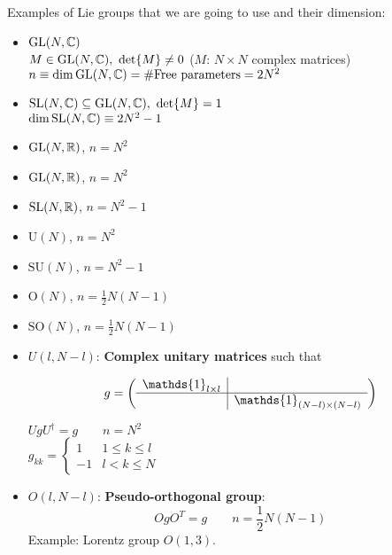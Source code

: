 \documentclass[../../main/main.tex]{subfiles}
\begin{document}
\begin{example}
	Examples of Lie groups that we are going to use and their dimension:
	\begin{itemize}
		\item $\mathrm{GL}(N,\mathbb{C})$\\
			$M \in \mathrm{GL}(N,\mathbb{C}), \ \det{M} \ne 0$ ($M$: $N \times N$ complex matrices)\\
			$n \equiv \dim{\mathrm{GL}(N,\mathbb{C})} = \# \text{Free parameters} = 2 N^2$

		\item $\mathrm{SL}(N,\mathbb{C}) \subseteq \mathrm{GL}(N,\mathbb{C}), \ \det{M} = 1$\\
			$\dim{\mathrm{SL}(N,\mathbb{C})} \equiv 2 N^2 - 1$

		\item $\mathrm{GL}(N,\mathbb{R})$, $n=N^2$

		\item $\mathrm{GL}(N,\mathbb{R})$, $n=N^2$

		\item $\mathrm{SL}(N,\mathbb{R})$, $n=N^2 - 1$

		\item $\mathrm{U}(N)$, $n=N^2$

		\item $\mathrm{SU}(N)$, $n=N^2 - 1$

		\item $\mathrm{O}(N)$, $n=\frac{1}{2} N(N-1)$

		\item $\mathrm{SO}(N)$, $n=\frac{1}{2} N(N-1)$

		\item $U(l,N-l)$: \textbf{Complex unitary matrices} such that

			\begin{minipage}[t]{0.45\textwidth}
				\strut\vspace*{-1.5\baselineskip}\newline
				\[
				g =
				\left(
				\begin{array}{c|c}
				\mathds{1}_{l \times l}
				&	\\
				\hline
				&
				\mathds{1}_{(N-l) \times (N-l)}
				\end{array}
				\right)
				\]
			\end{minipage}
			\begin{minipage}[t]{0.45\textwidth}
				$
				UgU^{\dagger} = g	\qquad n=N^2
				$\\
				$
				g_{kk} =
				\begin{cases}
				1	&	1 \le k \le l	\\
				-1	&	l < k \le N
				\end{cases}
				$
			\end{minipage}

		\item $O(l,N-l)$: \textbf{Pseudo-orthogonal group}:
			\begin{equation*}
				OgO^{T} = g	\qquad	n=\frac{1}{2}N(N-1)
			\end{equation*}
			Example: Lorentz group $O(1,3)$.
	\end{itemize}
\end{example}
\end{document}
